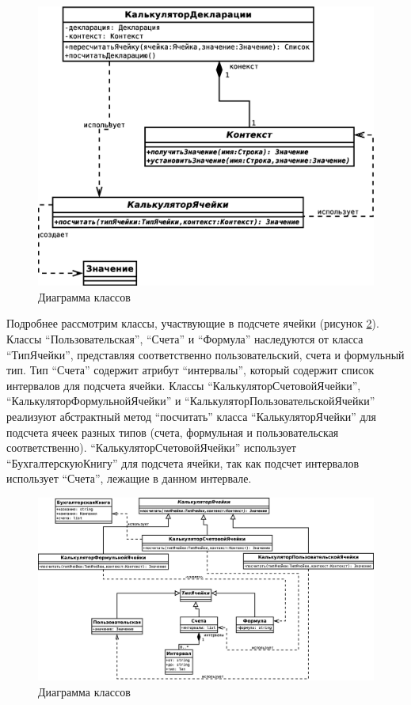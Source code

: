 \documentclass[14pt,a4paper]{reportmod}
\begin{document}
\begin{figure}
  \centering
  \includegraphics[scale=0.4]{uml/_classes_3}
  \caption{Диаграмма классов}
  \label{pic:classes_3}
\end{figure}


Подробнее рассмотрим классы, участвующие в подсчете ячейки (рисунок \ref{pic:classes_2}). Классы ``Пользовательская'', ``Счета'' и ``Формула'' наследуются от класса ``ТипЯчейки'', представляя соответственно пользовательский, счета и формульный тип. Тип ``Счета'' содержит атрибут ``интервалы'', который содержит список интервалов для подсчета ячейки. Классы ``КалькуляторСчетовойЯчейки'', ``КалькуляторФормульнойЯчейки'' и ``КалькуляторПользовательскойЯчейки'' реализуют абстрактный метод ``посчитать'' класса ``КалькуляторЯчейки'' для подсчета ячеек разных типов (счета, формульная и пользовательская соответственно). ``КалькуляторСчетовойЯчейки'' использует ``БухгалтерскуюКнигу'' для подсчета ячейки, так как подсчет интервалов использует ``Счета'', лежащие в данном интервале.

\begin{figure}
  \centering
  \includegraphics[scale=0.4]{uml/_classes_2}
  \caption{Диаграмма классов}
  \label{pic:classes_2}
\end{figure}
\end{document}
